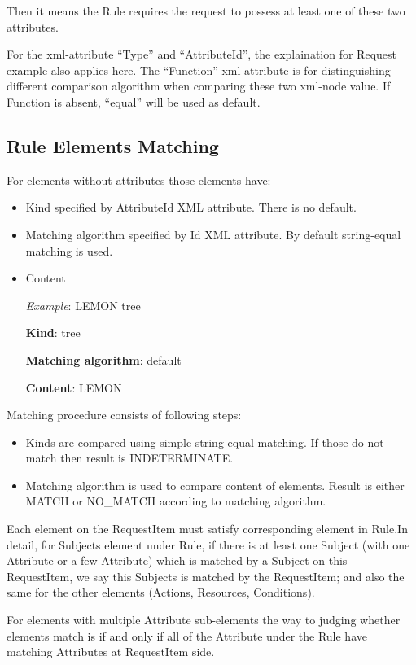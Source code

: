 \documentclass{book}
\begin{document}
Then it means the Rule requires the request to possess at least one of these two attributes.

For the xml-attribute ``Type'' and ``AttributeId'', the explaination for Request example also applies here.
The ``Function'' xml-attribute is for distinguishing different comparison algorithm when comparing these two xml-node value. If Function is absent, ``equal'' will be used as default.


\subsection{Rule Elements Matching} %
\label{subsec:rule_element_match}
For elements without attributes those elements have:

    \begin{itemize}
        \item Kind specified by AttributeId XML attribute. There is no default.
        \item Matching algorithm specified by Id XML attribute. By default string-equal matching is used.
        \item Content

        \textit{Example}: LEMON tree

        \textbf{Kind}: tree

        \textbf{Matching algorithm}: default

        \textbf{Content}: LEMON

    \end{itemize}

Matching procedure consists of following steps:
    \begin{itemize}
        \item Kinds are compared using simple string equal matching. If those do not match then result is INDETERMINATE.
        \item Matching algorithm is used to compare content of elements. Result is either MATCH or NO\_MATCH according to matching algorithm.
    \end{itemize}

Each element on the RequestItem must satisfy corresponding element in Rule.In detail, for Subjects element under Rule, if there is at least one Subject (with one Attribute or a few Attribute) which is matched by a Subject on this RequestItem, we say this Subjects is matched by the RequestItem; and also the same for the other elements (Actions, Resources, Conditions).

For elements with multiple Attribute sub-elements the way to judging whether elements match is if and only if all of the Attribute under the Rule have matching Attributes at RequestItem side.
\end{document}
